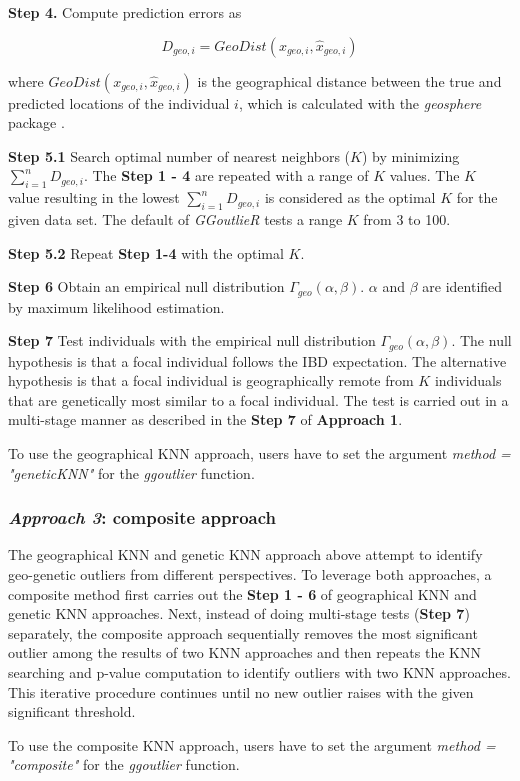 \documentclass[11pt]{article}
\begin{document}
\textbf{Step 4.} Compute prediction errors as 

\begin{equation} \label{Dgeo_eq}
D_{geo, i}=GeoDist(x_{geo,i}, \hat{x}_{geo,i})
\end{equation}

where $GeoDist(x_{geo,i}, \hat{x}_{geo,i})$ is the geographical distance between the true and predicted locations of the individual $i$, which is calculated with the \textit{geosphere} package \citep{hijmansgeosphere}.

\textbf{Step 5.1} Search optimal number of nearest neighbors ($K$) by minimizing $\sum_{i=1}^{n}D_{geo,i}$. 
The \textbf{Step 1 - 4} are repeated with a range of $K$ values.
The $K$ value resulting in the lowest $\sum_{i=1}^{n}D_{geo,i}$ is considered as the optimal $K$ for the given data set.
The default of \textit{GGoutlieR} tests a range $K$ from 3 to 100.

\textbf{Step 5.2} Repeat \textbf{Step 1-4} with the optimal $K$.

\textbf{Step 6} Obtain an empirical null distribution $\Gamma_{geo}(\alpha,\beta)$. $\alpha$ and $\beta$ are identified by maximum likelihood estimation.

\textbf{Step 7} Test individuals with the empirical null distribution $\Gamma_{geo}(\alpha,\beta)$. 
The null hypothesis is that a focal individual follows the IBD expectation. The alternative hypothesis is that a focal individual is geographically remote from $K$ individuals that are genetically most similar to a focal individual.
The test is carried out in a multi-stage manner as described in the \textbf{Step 7} of \textbf{Approach 1}.

To use the geographical KNN approach, users have to set the argument \textit{method = "geneticKNN"} for the \textit{ggoutlier} function.

\subsubsection*{\textit{Approach 3}: composite approach}

The geographical KNN and genetic KNN approach above attempt to identify geo-genetic outliers from different perspectives.
To leverage both approaches, a composite method first carries out the \textbf{Step 1 - 6} of geographical KNN and genetic KNN approaches.
Next, instead of doing multi-stage tests (\textbf{Step 7}) separately, the composite approach sequentially removes the most significant outlier among the results of two KNN approaches and then repeats the KNN searching and p-value computation to identify outliers with two KNN approaches.
This iterative procedure continues until no new outlier raises with the given significant threshold.

To use the composite KNN approach, users have to set the argument \textit{method = "composite"} for the \textit{ggoutlier} function.


\newpage



\end{document}
